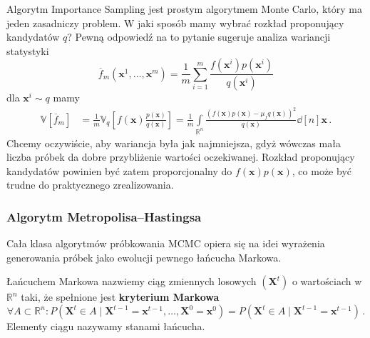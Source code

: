 \documentclass{myclass}
\numberwithin{equation}{subsection}
\begin{document}
Algorytm Importance Sampling jest prostym algorytmem Monte Carlo, który ma jeden zasadniczy problem.
W jaki sposób mamy wybrać rozkład proponujący kandydatów \(q\)? Pewną odpowiedź na to pytanie
sugeruje analiza wariancji statystyki 
\begin{equation}
    \overline{f}_m(\mathbf{x}^1,\ldots,\mathbf{x}^m) = \frac{1}{m}\sum_{i=1}^m \frac{f(\mathbf{x}^i)p(\mathbf{x}^i)}{q(\mathbf{x}^i)}
\end{equation}
dla \(\mathbf{x}^i \sim q\) mamy
\begin{equation}
    \begin{split}
        \mathbb{V}[\overline{f}_m] &= \frac{1}{m}\mathbb{V}_q\left[f(\mathbf{x})\frac{p(\mathbf{x})}{q(\mathbf{x})}\right] = \frac{1}{m}\int\limits_{\mathbb{R}^n}\frac{(f(\mathbf{x})p(\mathbf{x}) - \mu_fq(\mathbf{x}))^2}{q(\mathbf{x})}\dd[n]{\mathbf{x}}\,.
    \end{split}
\end{equation}
Chcemy oczywiście, aby wariancja była jak najmniejsza, gdyż wówczas mała liczba próbek da dobre
przybliżenie wartości oczekiwanej. Rozkład proponujący kandydatów powinien być zatem proporcjonalny
do \(f(\mathbf{x})p(\mathbf{x})\), co może być trudne do praktycznego zrealizowania.


\subsubsection{Algorytm Metropolisa--Hastingsa}

Cała klasa algorytmów próbkowania MCMC opiera się na idei wyrażenia generowania próbek jako ewolucji
pewnego łańcucha Markowa.

\begin{definition}
Łańcuchem Markowa nazwiemy ciąg zmiennych losowych \((\mathbf{X}^t)\) o wartościach w
\(\mathbb{R}^n\) taki, że spełnione jest \textbf{kryterium Markowa}
\begin{equation*}
    \forall A \subset \mathbb{R}^n : P(\mathbf{X}^t \in A \mid \mathbf{X}^{t-1} = \mathbf{x}^{t-1}, \ldots, \mathbf{X}^0 = \mathbf{x}^0) = P(\mathbf{X}^t \in A \mid \mathbf{X}^{t-1} = \mathbf{x}^{t-1})\,.
\end{equation*}
Elementy ciągu nazywamy stanami łańcucha.
\end{definition}
\end{document}
